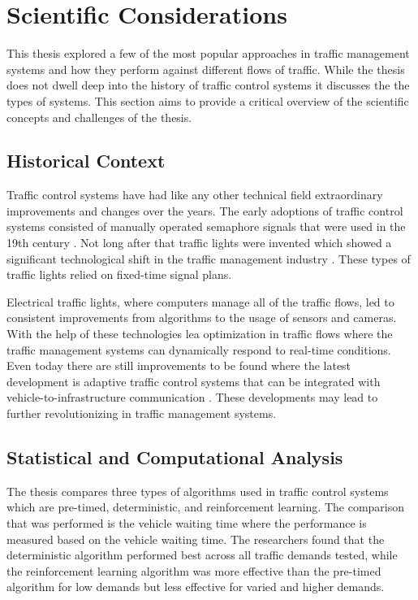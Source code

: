 \documentclass[10pt, titlepage]{article}
\begin{document}
\newpage
\section{Scientific Considerations}
This thesis explored a few of the most popular approaches in traffic management systems and how they perform against different flows of traffic. While the thesis does not dwell deep into the history of traffic control systems it discusses the the types of systems. This section aims to provide a critical overview of the scientific concepts and challenges of the thesis.

\subsection{Historical Context}
Traffic control systems have had like any other technical field extraordinary improvements and changes over the years. The early adoptions of traffic control systems consisted of manually operated semaphore signals that were used in the 19th century \cite{traffictechnologytoday2016}. Not long after that traffic lights were invented which showed a significant technological shift in the traffic management industry \cite{streetsmn}. These types of traffic lights relied on fixed-time signal plans.

Electrical traffic lights, where computers manage all of the traffic flows, led to consistent improvements from algorithms to the usage of sensors and cameras. With the help of these technologies lea optimization in traffic flows where the traffic management systems can dynamically respond to real-time conditions. Even today there are still improvements to be found where the latest development is adaptive traffic control systems that can be integrated with vehicle-to-infrastructure communication \cite{miller2008vehicle}. These developments may lead to further revolutionizing in traffic management systems.

\subsection{Statistical and Computational Analysis}
The thesis compares three types of algorithms used in traffic control systems which are pre-timed, deterministic, and reinforcement learning. The comparison that was performed is the vehicle waiting time where the performance is measured based on the vehicle waiting time. The researchers found that the deterministic algorithm performed best across all traffic demands tested, while the reinforcement learning algorithm was more effective than the pre-timed algorithm for low demands but less effective for varied and higher demands.
\end{document}
